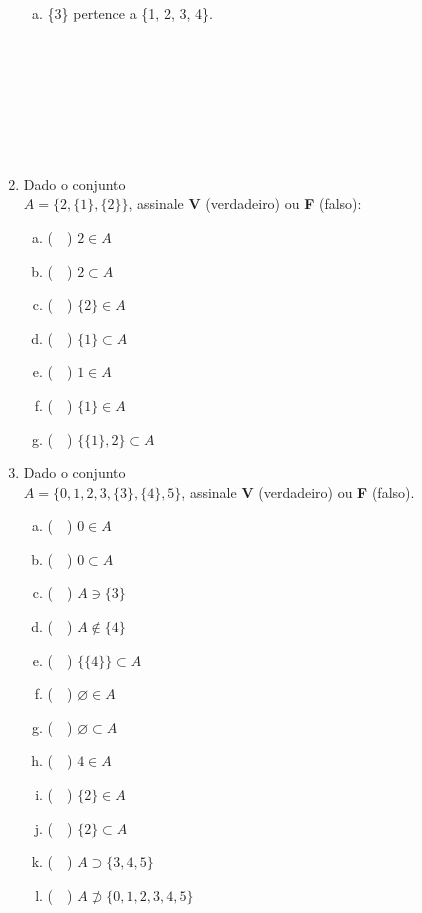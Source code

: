 \documentclass[a4paper,14pt]{article}
\begin{document}
\begin{multicols}{2}
\begin{enumerate}
\begin{enumerate}[a)]
   				\item \{3\} pertence a \{1, 2, 3, 4\}. \\\\\\\\\\\\\\\\
   			\end{enumerate}
   			\item Dado o conjunto \\ $A = \{2, \{1\}, \{2\}\}$, assinale \textbf{V} (verdadeiro) ou \textbf{F} (falso):
   			\begin{enumerate}[a)]
   				\item (~~) $2 \in A$ \\
   				\item (~~) $2 \subset A$ \\
   				\item (~~) $\{2\} \in A$ \\
   				\item (~~) $\{1\} \subset A$ \\
   				\item (~~) $1 \in A$ \\
   				\item (~~) $\{1\} \in A$ \\
   				\item (~~) $\{\{1\}, 2\} \subset A$ \\
   			\end{enumerate}
   			\item Dado o conjunto \\ $A = \{0, 1, 2, 3, \{3\}, \{4\}, 5\}$, assinale \textbf{V} (verdadeiro) ou \textbf{F} (falso).
   			\begin{enumerate}[a)]
   				\item (~~) $0 \in A$
   				\item (~~) $0 \subset A$
   				\item (~~) $A \ni \{3\}$
   				\item (~~) $A \notin \{4\}$
   				\item (~~) $\{\{4\}\} \subset A$
   				\item (~~) $\varnothing \in A$
   				\item (~~) $\varnothing \subset A$
   				\item (~~) $4 \in A$
   				\item (~~) $\{2\} \in A$
   				\item (~~) $\{2\} \subset A$
   				\item (~~) $A \supset \{3, 4, 5\}$
   				\item (~~) $A \not\supset \{0, 1, 2, 3, 4, 5\}$
   			\end{enumerate}
	    \end{enumerate} 
        $~$ \\ $~$ \\ $~$ \\ $~$ \\ $~$ \\ $~$
	\end{multicols}
\end{document}
